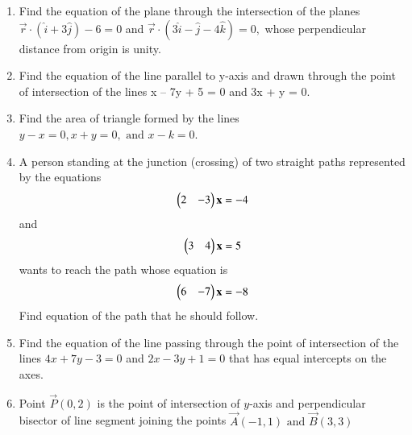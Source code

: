 \begin{enumerate}[label=\thesubsection.\arabic*,ref=\thesubsection.\theenumi]
\item Find the equation of the plane through the intersection of the planes $\overrightarrow{r} \cdot (\hat{i}+3\hat{j}) - 6=0$ and $\overrightarrow{r} \cdot (3\hat{i}-\hat{j}-4\hat{k})=0,$ whose perpendicular distance from origin is unity.
	\item  Find the equation of the line parallel to y-axis and drawn through the point of
intersection of the lines x – 7y + 5 = 0 and 3x + y = 0.
\\
\solution
		
	\item Find the area of triangle formed by the lines $y-x=0, x+y=0, \text{ and } x-k=0$.
		\\
\solution
		
    \item A person standing at the junction (crossing) of two straight paths 
    represented by the equations 
    \begin{align}
        \begin{pmatrix}2&-3\end{pmatrix}\mathbf{x} = -4 
        \label{eq:chapters/11/10/4/24/L1}
    \end{align}
    and
    \begin{align}
        \begin{pmatrix}3&4\end{pmatrix}\mathbf{x} = 5
        \label{eq:chapters/11/10/4/24/L2}
    \end{align} 
    wants to reach the path whose equation is 
    \begin{align}
        \begin{pmatrix}6&-7\end{pmatrix}\mathbf{x} = -8
        \label{eq:chapters/11/10/4/24/L3}
    \end{align}
    Find equation of the path that he should follow.
\\
    \solution 
		
	\item Find the equation of the line passing through the point of intersection of the lines $4x + 7y - 3 = 0$ and $2x - 3y + 1 = 0$ that has equal intercepts on the axes.\\
	\solution 
	  
\item  Point $\vec{P}(0,2)$ is the point of intersection of $y$-axis and perpendicular bisector of line segment joining the points $\vec{A}(-1,1) \text{ and } \vec{B}(3,3)$
\end{enumerate}
